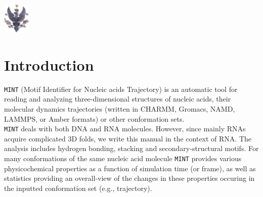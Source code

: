 \documentclass[12pt]{article}
\begin{document}
     {}  \includegraphics[width=0.1\textwidth]{./pictures/logoUW.png}

\newpage
\tableofcontents
\newpage
\newcommand*{\elem}[1]{{\color{Gray}{\tt{<#1>}}}}
\newcommand*{\greyT}[1]{{\color{Gray}{\tt{#1}}}}

\section{Introduction}
{\tt MINT} (Motif Identifier for Nucleic acids Trajectory) is an automatic tool for reading and analyzing three-dimensional structures of nucleic acids, their molecular dynamics trajectories (written in CHARMM, Gromacs, NAMD, LAMMPS, or Amber formats) or other conformation sets.\\

\noindent
{\tt MINT} deals with both DNA and RNA molecules. However, since mainly RNAs acquire complicated 3D folds, we write this manual in the context of RNA. The analysis includes hydrogen bonding, stacking and secondary-structural motifs. For many conformations of the same nucleic acid molecule {\tt MINT} provides various physicochemical properties as a function of simulation time (or frame), as well as statistics providing an overall-view of the changes in these properties occuring in the inputted conformation set (e.g., trajectory).\\
\end{document}
